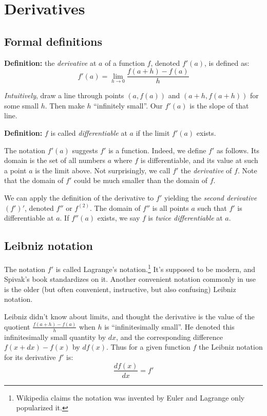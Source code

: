 
\section{Derivatives}

\subsection{Formal definitions}

\textbf{Definition:} the \textit{derivative} at $a$ of a function $f$,
denoted $f'(a)$, is defined as:
\[f'(a)=\lim_{h\to0}\frac{f(a+h)-f(a)}{h}\]

\textit{Intuitively}, draw a line through points $(a, f(a))$ and
$(a+h, f(a+h))$ for some small $h$. Then make $h$ ``infinitely small''.
Our $f'(a)$ is the slope of that line.

\vs

\textbf{Definition:} $f$ is called \textit{differentiable} at $a$ if
the limit $f'(a)$ exists.

\vs

The notation $f'(a)$ suggests $f'$ is a function. Indeed, we define
$f'$ as follows. Its domain is the set of all numbers $a$ where $f$ is
differentiable, and its value at such a point $a$ is the limit above.
Not surprisingly, we call $f'$ the \textit{derivative} of $f$. Note
that the domain of $f'$ could be much smaller than the domain of $f$.

\vs

We can apply the definition of the derivative to $f'$ yielding the
\textit{second derivative} $(f')'$, denoted $f''$ or $f^{(2)}$. The
domain of $f''$ is all points $a$ such that $f'$ is differentiable at
$a$. If $f''(a)$ exists, we say $f$ is \textit{twice differentiable}
at $a.$

\subsection{Leibniz notation}

The notation $f'$ is called Lagrange's notation.\footnote{Wikipedia
  claims the notation was invented by Euler and Lagrange only
  popularized it.} It's supposed to be modern, and Spivak's book
standardizes on it. Another convenient notation commonly in use is the
older (but often convenient, instructive, but also confusing) Leibniz
notation.

\vs

Leibniz didn't know about limits, and thought the derivative is the
value of the quotient $\frac{f(a+h)-f(a)}{h}$ when $h$ is
``infinitesimally small''. He denoted this infinitesimally small
quantity by $dx$, and the corresponding difference $f(x+dx)-f(x)$ by
$df(x)$. Thus for a given function $f$ the Leibniz notation for its
derivative $f'$ is:
\[\frac{df(x)}{dx}=f'\]

